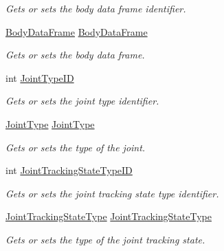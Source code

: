 \begin{DoxyCompactItemize}
\begin{DoxyCompactList}\small\item\em Gets or sets the body data frame identifier. \end{DoxyCompactList}\item 
\mbox{\hyperlink{class_bar_none_1_1_shared_1_1_domain_model_1_1_body_data_frame}{Body\+Data\+Frame}} \mbox{\hyperlink{class_bar_none_1_1_shared_1_1_domain_model_1_1_joint_a69c9e69085b602b5f2c4f2ba1a4613f9}{Body\+Data\+Frame}}
\begin{DoxyCompactList}\small\item\em Gets or sets the body data frame. \end{DoxyCompactList}\item 
int \mbox{\hyperlink{class_bar_none_1_1_shared_1_1_domain_model_1_1_joint_a84c3103ca199cf565eda5dad70f9f347}{Joint\+Type\+ID}}
\begin{DoxyCompactList}\small\item\em Gets or sets the joint type identifier. \end{DoxyCompactList}\item 
\mbox{\hyperlink{class_bar_none_1_1_shared_1_1_domain_model_1_1_joint_type}{Joint\+Type}} \mbox{\hyperlink{class_bar_none_1_1_shared_1_1_domain_model_1_1_joint_acee087e7568a394c4be77d1ae59f38f1}{Joint\+Type}}
\begin{DoxyCompactList}\small\item\em Gets or sets the type of the joint. \end{DoxyCompactList}\item 
int \mbox{\hyperlink{class_bar_none_1_1_shared_1_1_domain_model_1_1_joint_a96318c40263154d333ff0c7bf6d436b3}{Joint\+Tracking\+State\+Type\+ID}}
\begin{DoxyCompactList}\small\item\em Gets or sets the joint tracking state type identifier. \end{DoxyCompactList}\item 
\mbox{\hyperlink{class_bar_none_1_1_shared_1_1_domain_model_1_1_joint_tracking_state_type}{Joint\+Tracking\+State\+Type}} \mbox{\hyperlink{class_bar_none_1_1_shared_1_1_domain_model_1_1_joint_a066ad04f4bf54b89405c9d3cad5ab121}{Joint\+Tracking\+State\+Type}}
\begin{DoxyCompactList}\small\item\em Gets or sets the type of the joint tracking state. \end{DoxyCompactList}\end{DoxyCompactItemize}


